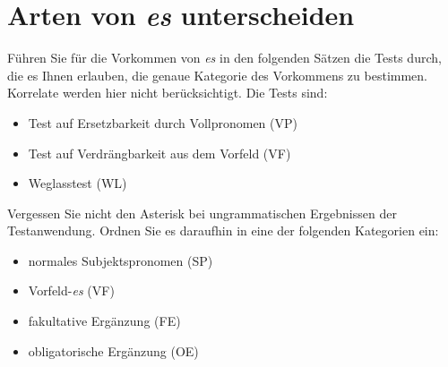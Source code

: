 \documentclass[12pt,a4paper,twoside]{article}
\newcommand{\Lf}{
  \setlength{\itemsep}{1pt}
  \setlength{\parskip}{0pt}
  \setlength{\parsep}{0pt}
}
\begin{document}
\section{Arten von \textit{es} unterscheiden}\label{sec:es}

Führen Sie für die Vorkommen von \textit{es} in den folgenden Sätzen die Tests durch, die es Ihnen erlauben, die genaue Kategorie des Vorkommens zu bestimmen.
Korrelate werden hier nicht berücksichtigt.
Die Tests sind:

\begin{itemize}\Lf
  \item Test auf Ersetzbarkeit durch Vollpronomen (VP)
  \item Test auf Verdrängbarkeit aus dem Vorfeld (VF)
  \item Weglasstest (WL)
\end{itemize}

Vergessen Sie nicht den Asterisk bei ungrammatischen Ergebnissen der Testanwendung.
Ordnen Sie es daraufhin in eine der folgenden Kategorien ein:

\begin{itemize}\Lf
  \item normales Subjektspronomen (SP)
  \item Vorfeld-\textit{es} (VF)
  \item fakultative Ergänzung (FE)
  \item obligatorische Ergänzung (OE)
\end{itemize}
\end{document}
